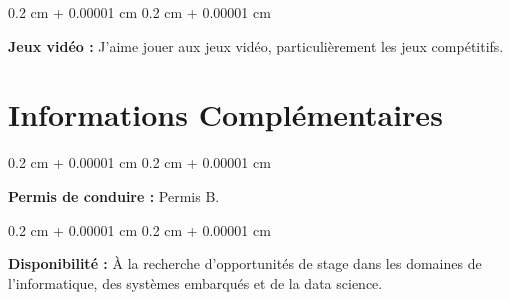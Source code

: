 \documentclass[10pt, a4]{article}
\newenvironment{onecolentry}{
    \begin{adjustwidth}{
        0.2 cm + 0.00001 cm
    }{
        0.2 cm + 0.00001 cm
    }
}{
    \end{adjustwidth}
} %
\begin{document}
        \vspace{0.2 cm}

        \begin{onecolentry}
            \textbf{Jeux vidéo :} J'aime jouer aux jeux vidéo, particulièrement
            les jeux compétitifs.
        \end{onecolentry}


    \section{Informations Complémentaires}

        \begin{onecolentry}
            \textbf{Permis de conduire :} Permis B.
        \end{onecolentry}

        \vspace{0.2 cm}

        \begin{onecolentry}
            \textbf{Disponibilité :} À la recherche d'opportunités de stage dans
            les domaines de l'informatique, des systèmes embarqués et de la data
            science.
        \end{onecolentry}
\end{document}
